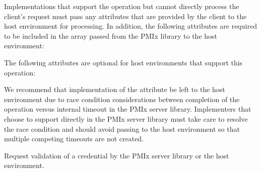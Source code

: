 Implementations that support the operation but cannot directly process the client's request must pass any attributes that are provided by the client to the host environment for processing. In addition, the following attributes are required to be included in the  array passed from the \ac{PMIx} library to the host environment:


\reqattrend

\optattrstart
The following attributes are optional for host environments that support this operation:


\optattrend

\adviceimplstart
We recommend that implementation of the  attribute be left to the host environment due to race condition considerations between completion of the operation versus internal timeout in the \ac{PMIx} server library. Implementers that choose to support  directly in the \ac{PMIx} server library must take care to resolve the race condition and should avoid passing  to the host environment so that multiple competing timeouts are not created.
\adviceimplend


\descr

Request validation of a credential by the \ac{PMIx} server library or the host environment.



